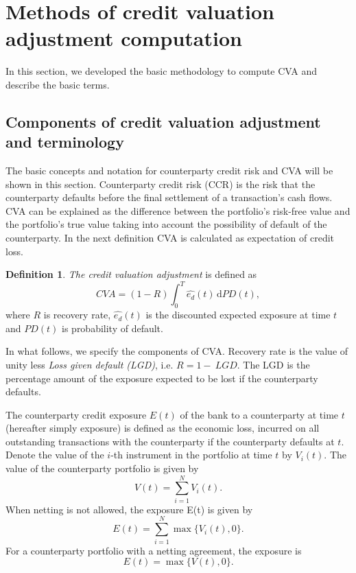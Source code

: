 \documentclass{amsart}
\theoremstyle{definition}\newtheorem{definition}[theorem]{Definition}
\theoremstyle{remark}\newtheorem{remark}[theorem]{Remark}
\newcommand{\dif}{\,\mathrm{d}}
\begin{document}
\section{Methods of credit valuation adjustment computation} 
In this section, we developed the basic methodology to compute CVA and describe the basic terms.

\subsection{Components of credit valuation adjustment and terminology}
The basic concepts and notation for counterparty credit risk and CVA will be shown in this section.
Counterparty credit risk (CCR) is the risk that the counterparty defaults before the final settlement of a transaction's cash flows.
CVA can be explained as the difference between the portfolio's risk-free value and the portfolio's true value taking into account the possibility of default of the counterparty.
In the next definition CVA is calculated as expectation of credit loss.
\begin{definition}
 \textit{The credit valuation adjustment} is defined as
 \begin{equation}
 CVA=(1-R)\int_{0}^T \hat{e_d}(t)\dif PD(t),
 \label{CVA}
\end{equation}
  where $R$ is recovery rate, $\hat{e_d}(t)$ is the discounted expected exposure at time $t$ and $PD(t)$ is probability of default.
\end{definition}
In what follows, we specify the components of CVA. 
Recovery rate is the value of unity less \textit{Loss given default (LGD)}, i.e. $R=1-~LGD$.
The LGD is the percentage amount of the exposure expected to be lost if the counterparty defaults.

The counterparty credit exposure $E(t)$ of the bank to a counterparty at time $t$ (hereafter simply exposure) is defined as the economic loss, incurred on all outstanding transactions with the counterparty if the counterparty defaults at $t$.
Denote the value of the $i$-th instrument in the portfolio at time $t$ by  $V_i(t)$. 
The value of the counterparty portfolio is given by 
\begin{equation}
V(t)=\sum_{i=1}^N V_i(t).
\end{equation}
When netting is not allowed, the exposure E(t) is given by
\begin{equation}
E(t)=\sum_{i=1}^N\max\{V_i(t),0\}.
\end{equation}
For a counterparty portfolio with a netting agreement, the exposure is
\begin{equation}
E(t)=\max\{V(t),0\}.
\label{totalExposure}
\end{equation}
\end{document}
